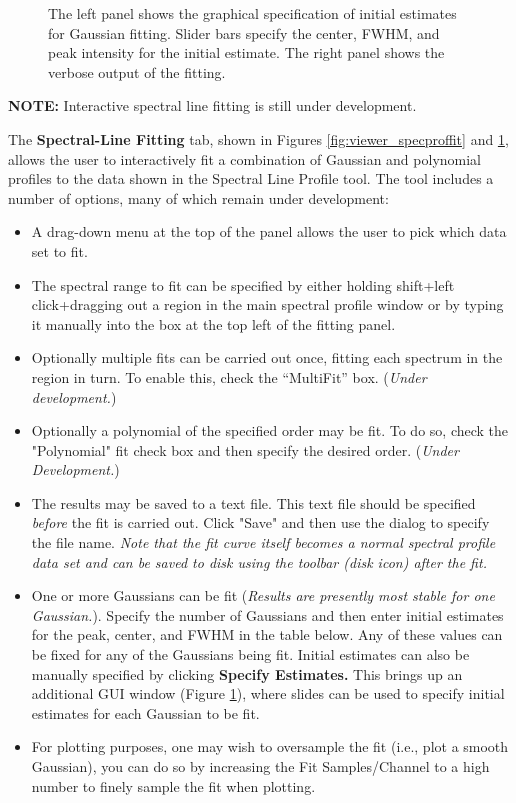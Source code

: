 \begin{figure}[h!]
\begin{center}
\caption{\label{fig:viewer_specproffit_2} The left panel shows the graphical specification of initial estimates for Gaussian fitting.
Slider bars specify the center, FWHM, and peak intensity for the initial estimate. The right panel shows the verbose output of
the fitting.}
\hrulefill
\end{center}
\end{figure}

{\bf NOTE:} Interactive spectral line fitting is still under development.

The {\bf Spectral-Line Fitting} tab, shown in Figures \ref{fig:viewer_specproffit} and \ref{fig:viewer_specproffit_2}, 
allows the user to interactively fit a combination of Gaussian and polynomial profiles to the data shown 
in the Spectral Line Profile tool. The tool includes a number of options, many of which remain under
development:

\begin{itemize}
\item A drag-down menu at the top of the panel allows the user to pick which data set to fit.
\item The spectral range to fit can be specified by either holding shift+left click+dragging out a region in the 
main spectral profile window or by typing it manually into the box at the top left of the fitting panel.
\item Optionally multiple fits can be carried out once, fitting each spectrum in the region in turn. To enable this,
check the ``MultiFit'' box. ({\em Under development.})
\item Optionally a polynomial of the specified order may be fit. To do so, check the "Polynomial" fit check box
and then specify the desired order. ({\em Under Development.}) 
\item The results may be saved to a text file. This text file should be specified {\em before} the fit is carried out. Click
"Save" and then use the dialog to specify the file name. {\em Note that 
the fit curve itself becomes a normal spectral profile data set and can be saved to disk using the toolbar (disk icon) after the 
fit.}
\item One or more Gaussians can be fit ({\em Results are presently most stable for one Gaussian.}). Specify the number of
Gaussians and then enter initial estimates for the peak, center, and FWHM in the table below. Any of these values can be fixed
for any of the Gaussians being fit. Initial estimates can also be manually specified by clicking {\bf Specify Estimates.} This brings up an additional 
GUI window (Figure \ref{fig:viewer_specproffit_2}), where slides can be used to specify initial estimates for each Gaussian to be fit.
\item For plotting purposes, one may wish to oversample the fit (i.e., plot a smooth Gaussian), you can do so by increasing the Fit Samples/Channel
to a high number to finely sample the fit when plotting.
\end{itemize}

